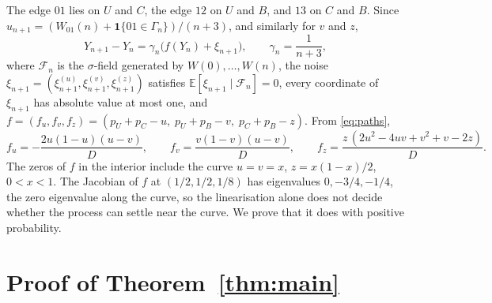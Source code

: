 \documentclass[11pt]{amsart}
\theoremstyle{remark}
\newcommand{\E}{\mathbb{E}}
\newcommand{\cF}{\mathcal{F}}
\begin{document}
The edge $01$ lies on $U$ and $C$, the edge $12$ on $U$ and $B$, and $13$ on $C$ and $B$. Since $u_{n+1}=(W_{01}(n)+\mathbf 1\{01\in\Gamma_n\})/(n+3)$, and similarly for $v$ and $z$,
\begin{equation}\label{eq:sa}
Y_{n+1}-Y_n=\gamma_n\bigl(f(Y_n)+\xi_{n+1}\bigr),\qquad \gamma_n=\frac1{n+3},
\end{equation}
where $\cF_n$ is the $\sigma$-field generated by $W(0),\dots,W(n)$, the noise $\xi_{n+1}=(\xi^{(u)}_{n+1},\xi^{(v)}_{n+1},\xi^{(z)}_{n+1})$ satisfies $\E[\xi_{n+1}\mid\cF_n]=0$, every coordinate of $\xi_{n+1}$ has absolute value at most one, and $f=(f_u,f_v,f_z)=(p_U+p_C-u,\;p_U+p_B-v,\;p_C+p_B-z)$. From \eqref{eq:paths},
\begin{equation}\label{eq:drift}
f_u=-\frac{2u(1-u)(u-v)}{D},\qquad f_v=\frac{v(1-v)(u-v)}{D},\qquad f_z=\frac{z\,(2u^2-4uv+v^2+v-2z)}{D}.
\end{equation}
The zeros of $f$ in the interior include the curve $u=v=x$, $z=x(1-x)/2$, $0<x<1$. The Jacobian of $f$ at $(1/2,1/2,1/8)$ has eigenvalues $0,-3/4,-1/4$, the zero eigenvalue along the curve, so the linearisation alone does not decide whether the process can settle near the curve. We prove that it does with positive probability.

\section{Proof of Theorem~\ref{thm:main}}\label{sec:trap}
\end{document}
